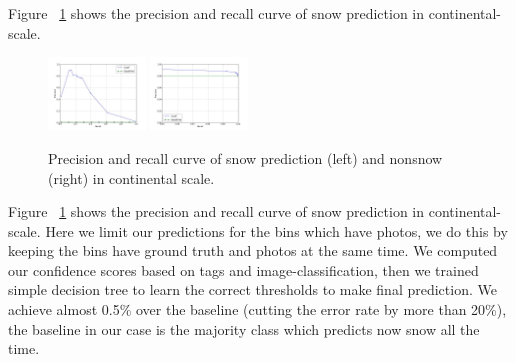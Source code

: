 \documentclass[10pt,journal,compsoc]{IEEEtran}
\begin{document}
Figure ~\ref{fig:snowcurve} shows the precision and recall curve of snow prediction in continental-scale.
\begin{figure}
\begin{center}

\includegraphics[width=0.23\textwidth]{figs/PR-snow.jpg}
\includegraphics[width=0.23\textwidth]{figs/PR-nonsnow.jpg}

\end{center}
\vspace{-24pt}
\caption{Precision and recall curve of snow prediction (left) and nonsnow (right) in continental scale.}
\label{fig:snowcurve}
\vspace{-12pt}
\end{figure}
Figure ~\ref{fig:snowcurve} shows the precision and recall curve of snow prediction in continental-scale.
%
%
%
Here we limit our predictions for the bins which have photos, we do this by keeping the bins have ground truth and photos at the same time. 
We computed our confidence scores based on tags and image-classification, then we trained simple decision tree to learn the correct thresholds to make final prediction. We achieve almost 0.5\% over the baseline (cutting the error rate by more than 20\%), the baseline in our case is the majority class which predicts now snow all the time.  
  
\end{document}
